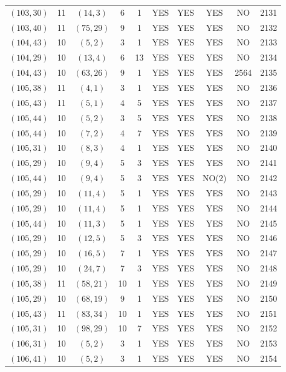 \begin{longtable}{|c|c|c|c|c|c|c|c|c|c|}
$(103, 30)$ & 11 & $(14, 3)$ & 6 & 1 & YES & YES & YES & NO & 2131\\
$(103, 40)$ & 11 & $(75, 29)$ & 9 & 1 & YES & YES & YES & NO & 2132\\
$(104, 43)$ & 10 & $(5, 2)$ & 3 & 1 & YES & YES & YES & NO & 2133\\
$(104, 29)$ & 10 & $(13, 4)$ & 6 & 13 & YES & YES & YES & NO & 2134\\
$(104, 43)$ & 10 & $(63, 26)$ & 9 & 1 & YES & YES & YES & 2564 & 2135\\
$(105, 38)$ & 11 & $(4, 1)$ & 3 & 1 & YES & YES & YES & NO & 2136\\
$(105, 43)$ & 11 & $(5, 1)$ & 4 & 5 & YES & YES & YES & NO & 2137\\
$(105, 44)$ & 10 & $(5, 2)$ & 3 & 5 & YES & YES & YES & NO & 2138\\
$(105, 44)$ & 10 & $(7, 2)$ & 4 & 7 & YES & YES & YES & NO & 2139\\
$(105, 31)$ & 10 & $(8, 3)$ & 4 & 1 & YES & YES & YES & NO & 2140\\
$(105, 29)$ & 10 & $(9, 4)$ & 5 & 3 & YES & YES & YES & NO & 2141\\
$(105, 44)$ & 10 & $(9, 4)$ & 5 & 3 & YES & YES & NO(2) & NO & 2142\\
$(105, 29)$ & 10 & $(11, 4)$ & 5 & 1 & YES & YES & YES & NO & 2143\\
$(105, 29)$ & 10 & $(11, 4)$ & 5 & 1 & YES & YES & YES & NO & 2144\\
$(105, 44)$ & 10 & $(11, 3)$ & 5 & 1 & YES & YES & YES & NO & 2145\\
$(105, 29)$ & 10 & $(12, 5)$ & 5 & 3 & YES & YES & YES & NO & 2146\\
$(105, 29)$ & 10 & $(16, 5)$ & 7 & 1 & YES & YES & YES & NO & 2147\\
$(105, 29)$ & 10 & $(24, 7)$ & 7 & 3 & YES & YES & YES & NO & 2148\\
$(105, 38)$ & 11 & $(58, 21)$ & 10 & 1 & YES & YES & YES & NO & 2149\\
$(105, 29)$ & 10 & $(68, 19)$ & 9 & 1 & YES & YES & YES & NO & 2150\\
$(105, 43)$ & 11 & $(83, 34)$ & 10 & 1 & YES & YES & YES & NO & 2151\\
$(105, 31)$ & 10 & $(98, 29)$ & 10 & 7 & YES & YES & YES & NO & 2152\\
$(106, 31)$ & 10 & $(5, 2)$ & 3 & 1 & YES & YES & YES & NO & 2153\\
$(106, 41)$ & 10 & $(5, 2)$ & 3 & 1 & YES & YES & YES & NO & 2154\\

\end{longtable}
